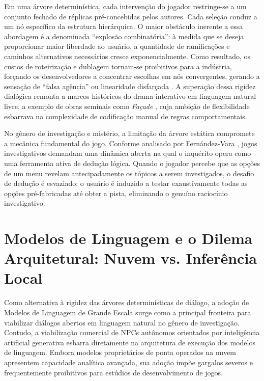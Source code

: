 Em uma árvore determinística, cada intervenção do jogador restringe-se a um conjunto fechado de réplicas pré-concebidas pelos autores. Cada seleção conduz a um nó específico da estrutura hierárquica. O maior obstáculo inerente a essa abordagem é a denominada ``explosão combinatória'': à medida que se deseja proporcionar maior liberdade ao usuário, a quantidade de ramificações e caminhos alternativos necessários cresce exponencialmente. Como resultado, os custos de roteirização e dublagem tornam-se proibitivos para a indústria, forçando os desenvolvedores a concentrar escolhas em nós convergentes, gerando a sensação de ``falsa agência'' ou linearidade disfarçada \cite{riedl2013interactive}. A superação dessa rigidez dialógica remonta a marcos históricos do drama interativo em linguagem natural livre, a exemplo de obras seminais como \textit{Façade} \cite{mateas2003facade}, cuja ambição de flexibilidade esbarrava na complexidade de codificação manual de regras comportamentais.

No gênero de investigação e mistério, a limitação da árvore estática compromete a mecânica fundamental do jogo. Conforme analisado por Fern{\'a}ndez-Vara \cite{fernandez2014introduction}, jogos investigativos demandam uma dinâmica aberta na qual o inquérito opera como uma ferramenta ativa de dedução lógica. Quando o jogador percebe que as opções de um menu revelam antecipadamente os tópicos a serem investigados, o desafio de dedução é esvaziado; o usuário é induzido a testar exaustivamente todas as opções pré-fabricadas até obter a pista, eliminando o genuíno raciocínio investigativo.

\section{Modelos de Linguagem e o Dilema Arquitetural: Nuvem vs. Inferência Local}
\label{sec:ref_llms}
\label{subsec:ref_custos_tokens}

Como alternativa à rigidez das árvores determinísticas de diálogo, a adoção de Modelos de Linguagem de Grande Escala surge como a principal fronteira para viabilizar diálogos abertos em linguagem natural no gênero de investigação. Contudo, a viabilização comercial de NPCs autônomos orientados por inteligência artificial generativa esbarra diretamente na arquitetura de execução dos modelos de linguagem. Embora modelos proprietários de ponta operados na nuvem apresentem capacidade analítica avançada, sua adoção impõe gargalos severos e frequentemente proibitivos para estúdios de desenvolvimento de jogos.

